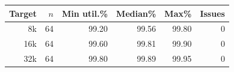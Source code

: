 \begin{tabular}{@{}rrrrrr@{}}
\toprule
Target & $n$ & Min util.\% & Median\% & Max\% & Issues \\
\midrule
8k & 64 & 99.20 & 99.56 & 99.80 & 0 \\
16k & 64 & 99.60 & 99.81 & 99.90 & 0 \\
32k & 64 & 99.80 & 99.89 & 99.95 & 0 \\
\bottomrule
\end{tabular}
